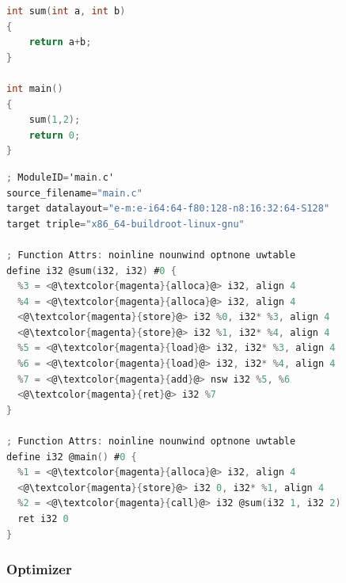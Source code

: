 \documentclass[12pt,a4paper,oneside]{article}
\begin{document}
\noindent\begin{minipage}{.25\textwidth}
\begin{lstlisting}[language=C,caption={C example},captionpos=b,showstringspaces=false]
int sum(int a, int b)
{
	return a+b;
}

int main()
{
	sum(1,2);
	return 0;
}
\end{lstlisting}
\end{minipage}\hfill
\begin{minipage}{.68\textwidth}
\begin{lstlisting}[language=C,caption={Equivalent code in LLVM IR},captionpos=b,showstringspaces=false, keywords={i32,align,define}]
; ModuleID='main.c'
source_filename="main.c"
target datalayout="e-m:e-i64:64-f80:128-n8:16:32:64-S128"
target triple="x86_64-buildroot-linux-gnu"

; Function Attrs: noinline nounwind optnone uwtable
define i32 @sum(i32, i32) #0 {
  %3 = <@\textcolor{magenta}{alloca}@> i32, align 4
  %4 = <@\textcolor{magenta}{alloca}@> i32, align 4
  <@\textcolor{magenta}{store}@> i32 %0, i32* %3, align 4
  <@\textcolor{magenta}{store}@> i32 %1, i32* %4, align 4
  %5 = <@\textcolor{magenta}{load}@> i32, i32* %3, align 4
  %6 = <@\textcolor{magenta}{load}@> i32, i32* %4, align 4
  %7 = <@\textcolor{magenta}{add}@> nsw i32 %5, %6
  <@\textcolor{magenta}{ret}@> i32 %7
}

; Function Attrs: noinline nounwind optnone uwtable
define i32 @main() #0 {
  %1 = <@\textcolor{magenta}{alloca}@> i32, align 4
  <@\textcolor{magenta}{store}@> i32 0, i32* %1, align 4
  %2 = <@\textcolor{magenta}{call}@> i32 @sum(i32 1, i32 2)
  ret i32 0
}
\end{lstlisting}
\end{minipage}

\subsubsection{Optimizer}
\end{document}
